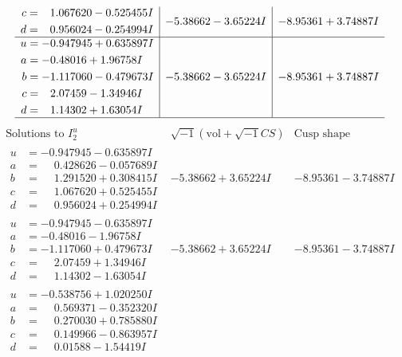 \documentclass[1p]{elsarticle_modified}
\theoremstyle{definition}
\newcommand{\I}{\sqrt{-1}}
\begin{document}
$$\begin{array}{c|c|c}
\begin{aligned}
c &= \phantom{-}1.067620 - 0.525455 I \\
d &= \phantom{-}0.956024 - 0.254994 I\end{aligned}
 & -5.38662 - 3.65224 I & -8.95361 + 3.74887 I \\ \hline\begin{aligned}
u &= -0.947945 + 0.635897 I \\
a &= -0.48016 + 1.96758 I \\
b &= -1.117060 - 0.479673 I \\
c &= \phantom{-}2.07459 - 1.34946 I \\
d &= \phantom{-}1.14302 + 1.63054 I\end{aligned}
 & -5.38662 - 3.65224 I & -8.95361 + 3.74887 I\\
 \hline 
 \end{array}$$\newpage$$\begin{array}{c|c|c}  
\text{Solutions to }I^u_{2}& \I (\text{vol} + \sqrt{-1}CS) & \text{Cusp shape}\\
 \hline 
\begin{aligned}
u &= -0.947945 - 0.635897 I \\
a &= \phantom{-}0.428626 - 0.057689 I \\
b &= \phantom{-}1.291520 + 0.308415 I \\
c &= \phantom{-}1.067620 + 0.525455 I \\
d &= \phantom{-}0.956024 + 0.254994 I\end{aligned}
 & -5.38662 + 3.65224 I & -8.95361 - 3.74887 I \\ \hline\begin{aligned}
u &= -0.947945 - 0.635897 I \\
a &= -0.48016 - 1.96758 I \\
b &= -1.117060 + 0.479673 I \\
c &= \phantom{-}2.07459 + 1.34946 I \\
d &= \phantom{-}1.14302 - 1.63054 I\end{aligned}
 & -5.38662 + 3.65224 I & -8.95361 - 3.74887 I \\ \hline\begin{aligned}
u &= -0.538756 + 1.020250 I \\
a &= \phantom{-}0.569371 - 0.352320 I \\
b &= \phantom{-}0.270030 + 0.785880 I \\
c &= \phantom{-}0.149966 - 0.863957 I \\
d &= \phantom{-}0.01588 - 1.54419 I\end{aligned}

\end{array}$$
\end{document}
